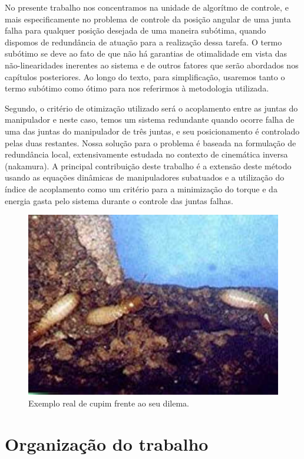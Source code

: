 No presente trabalho nos concentramos na unidade de algorítmo de controle, e mais especificamente no problema de controle da posição  angular de uma junta falha para qualquer posição desejada de uma maneira subótima, quando dispomos
de redundância de atuação para a realização dessa tarefa. O termo subótimo se deve ao fato de que não há garantias de otimalidade em vista das não-linearidades inerentes ao sistema e de outros fatores que serão abordados nos capítulos posteriores. Ao longo do texto, para simplificação, usaremos tanto o termo subótimo como ótimo para nos referirmos à metodologia utilizada.

Segundo, o critério de otimização utilizado será o acoplamento entre as juntas do
manipulador e neste caso, temos um sistema redundante quando ocorre falha de uma das juntas do manipulador de três juntas, e seu posicionamento é controlado pelas duas restantes. Nossa solução para o problema é baseada na formulação
de redundância local, extensivamente estudada no contexto de cinemática inversa ({nakamura}). A principal contribuição deste trabalho é a extensão deste método usando as equações dinâmicas de manipuladores subatuados e a utilização do índice de acoplamento como um critério para a minimização do torque e da energia gasta pelo sistema durante o controle das juntas falhas.

\begin{figure}[ht!]
\centering
\includegraphics[width=1\textwidth]{texts/cap1/figs/cupimconcreto}
\caption{Exemplo real de cupim frente ao seu dilema.}
\label{FDII}
\end{figure}

\section{Organização do trabalho}
